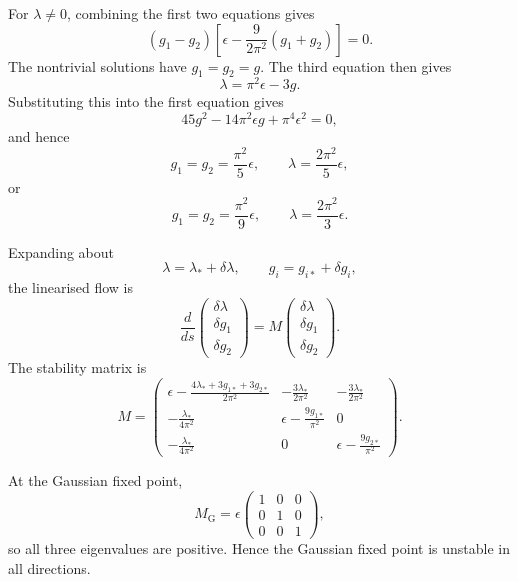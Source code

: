 \begin{solution}
For $\lambda\neq0$, combining the first two equations gives
\begin{equation}
(g_1-g_2)\left[
\epsilon-\frac{9}{2\pi^2}(g_1+g_2)
\right]=0.
\end{equation}
The nontrivial solutions have $g_1=g_2=g$. The third equation then gives
\begin{equation}
\lambda=\pi^2\epsilon-3g.
\end{equation}
Substituting this into the first equation gives
\begin{equation}
45g^2-14\pi^2\epsilon g+\pi^4\epsilon^2=0,
\end{equation}
and hence
\begin{equation}
g_1=g_2=\frac{\pi^2}{5}\epsilon,
\qquad
\lambda=\frac{2\pi^2}{5}\epsilon,
\end{equation}
or
\begin{equation}
g_1=g_2=\frac{\pi^2}{9}\epsilon,
\qquad
\lambda=\frac{2\pi^2}{3}\epsilon.
\end{equation}

Expanding about
\[
\lambda=\lambda_*+\delta\lambda,
\qquad
g_i=g_{i*}+\delta g_i,
\]
the linearised flow is
\begin{equation}
\frac{d}{ds}
\begin{pmatrix}
\delta\lambda\\
\delta g_1\\
\delta g_2
\end{pmatrix}
=
M
\begin{pmatrix}
\delta\lambda\\
\delta g_1\\
\delta g_2
\end{pmatrix}.
\end{equation}
The stability matrix is
\[
M=
\begin{pmatrix}
\displaystyle
\epsilon-\frac{4\lambda_*+3g_{1*}+3g_{2*}}{2\pi^2}
&
\displaystyle-\frac{3\lambda_*}{2\pi^2}
&
\displaystyle-\frac{3\lambda_*}{2\pi^2}
\\[6pt]
\displaystyle-\frac{\lambda_*}{4\pi^2}
&
\displaystyle\epsilon-\frac{9g_{1*}}{\pi^2}
&
0
\\[6pt]
\displaystyle-\frac{\lambda_*}{4\pi^2}
&
0
&
\displaystyle\epsilon-\frac{9g_{2*}}{\pi^2}
\end{pmatrix}.
\]

At the Gaussian fixed point,
\begin{equation}
M_{\mathrm{G}}=\epsilon
\begin{pmatrix}
1&0&0\\
0&1&0\\
0&0&1
\end{pmatrix},
\end{equation}
so all three eigenvalues are positive. Hence the Gaussian fixed point is unstable in all directions.


\end{solution}
